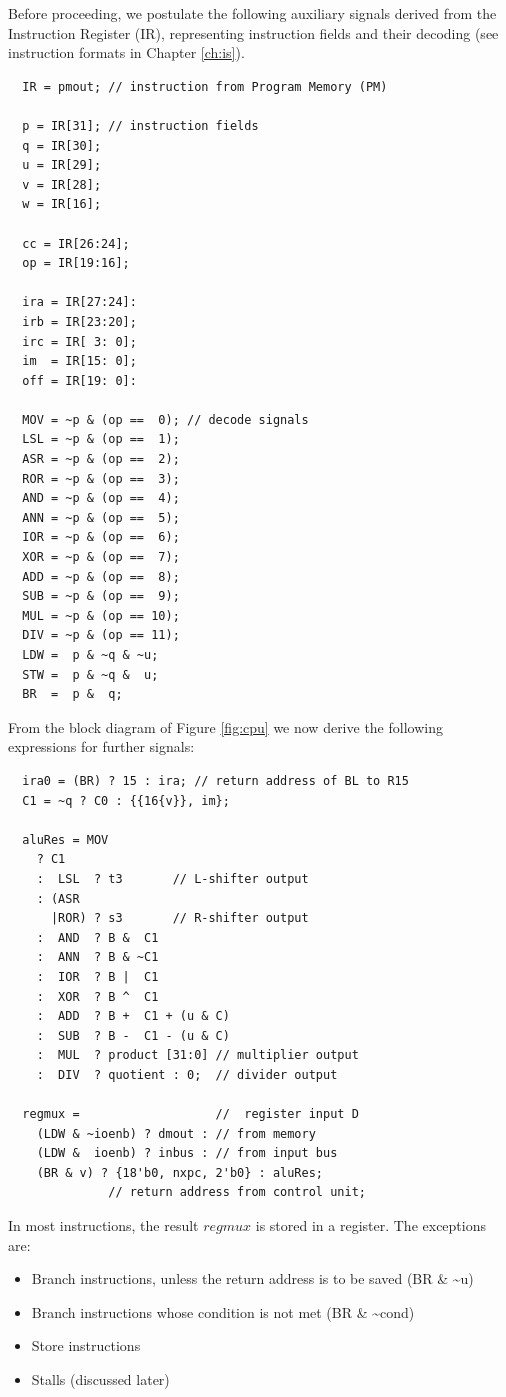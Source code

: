 Before proceeding, we postulate the following auxiliary signals derived from the Instruction
Register (IR), representing instruction fields and their decoding (see instruction formats
in Chapter \ref{ch:is}).
\begin{verbatim}
  IR = pmout; // instruction from Program Memory (PM)

  p = IR[31]; // instruction fields
  q = IR[30];
  u = IR[29];
  v = IR[28];
  w = IR[16];

  cc = IR[26:24];
  op = IR[19:16];

  ira = IR[27:24]:
  irb = IR[23:20];
  irc = IR[ 3: 0];
  im  = IR[15: 0];
  off = IR[19: 0]:
 
  MOV = ~p & (op ==  0); // decode signals
  LSL = ~p & (op ==  1);
  ASR = ~p & (op ==  2);
  ROR = ~p & (op ==  3);
  AND = ~p & (op ==  4);
  ANN = ~p & (op ==  5);
  IOR = ~p & (op ==  6);
  XOR = ~p & (op ==  7);
  ADD = ~p & (op ==  8);
  SUB = ~p & (op ==  9);
  MUL = ~p & (op == 10);
  DIV = ~p & (op == 11);
  LDW =  p & ~q & ~u;
  STW =  p & ~q &  u;
  BR  =  p &  q;
\end{verbatim}

From the block diagram of Figure \ref{fig:cpu} we now derive the following expressions for further signals:
\begin{verbatim}
  ira0 = (BR) ? 15 : ira; // return address of BL to R15
  C1 = ~q ? C0 : {{16{v}}, im};

  aluRes = MOV
    ? C1
    :  LSL  ? t3       // L-shifter output
    : (ASR
      |ROR) ? s3       // R-shifter output
    :  AND  ? B &  C1
    :  ANN  ? B & ~C1
    :  IOR  ? B |  C1
    :  XOR  ? B ^  C1
    :  ADD  ? B +  C1 + (u & C)
    :  SUB  ? B -  C1 - (u & C)
    :  MUL  ? product [31:0] // multiplier output
    :  DIV  ? quotient : 0;  // divider output

  regmux =                   //  register input D
    (LDW & ~ioenb) ? dmout : // from memory
    (LDW &  ioenb) ? inbus : // from input bus
    (BR & v) ? {18'b0, nxpc, 2'b0} : aluRes;
              // return address from control unit;
\end{verbatim}

In most instructions, the result $regmux$ is stored in a register. The exceptions are:
\begin{itemize}
  \item Branch instructions, unless the return address is to be saved (BR \& \textasciitilde{}u)
  \item Branch instructions whose condition is not met (BR \& \textasciitilde{}cond)
  \item Store instructions
  \item Stalls (discussed later)
\end{itemize}

